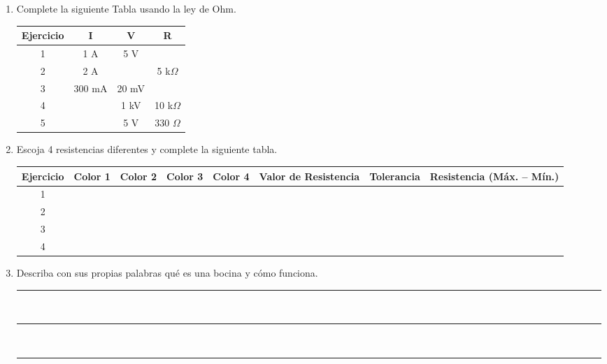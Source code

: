 \documentclass[11pt,a4paper]{article}
\newcommand{\linearesp}{\noindent\rule{\linewidth}{0.4pt}\\[10pt]}
\begin{document}
\begin{enumerate}
\item Complete la siguiente Tabla usando la ley de Ohm.

\begin{table}[H]
    \centering
    \renewcommand{\arraystretch}{1.4}
    \begin{tabular}{|c|c|c|c|}
    \hline
    \textbf{Ejercicio} & \textbf{I} & \textbf{V} & \textbf{R}\\
    \hline
    1 & 1 A      & 5 V    & \\
    \hline
    2 & 2 A      &        & 5 k$\Omega$\\
    \hline
    3 & 300 mA   & 20 mV  & \\
    \hline
    4 &          & 1 kV   & 10 k$\Omega$\\
    \hline
    5 &          & 5 V    & 330 $\Omega$\\
    \hline
    \end{tabular}
\end{table}

\item Escoja 4 resistencias diferentes y complete la siguiente tabla.

\begin{table}[H]
    \centering
    \footnotesize
    \renewcommand{\arraystretch}{1.6}
    \begin{tabular}{|c|c|c|c|c|c|c|c|}
    \hline
    \textbf{Ejercicio} & \textbf{Color 1} & \textbf{Color 2} & \textbf{Color 3} &
    \textbf{Color 4} & \textbf{\parbox{1.6cm}{\centering Valor de Resistencia}} &
    \textbf{Tolerancia} & \textbf{\parbox{2.2cm}{\centering Resistencia (Máx. -- Mín.)}}\\
    \hline
    1 & & & & & & & \\
    \hline
    2 & & & & & & & \\
    \hline
    3 & & & & & & & \\
    \hline
    4 & & & & & & & \\
    \hline
    \end{tabular}
\end{table}

\item Describa con sus propias palabras qué es una bocina y cómo funciona.

\vspace{0.4cm}
\linearesp
\linearesp
\linearesp
\end{enumerate}

\end{document}
